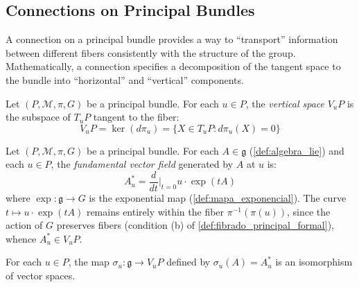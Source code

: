 \subsection{Connections on Principal Bundles}\label{subsec:conexiones_fibrados}

A connection on a principal bundle provides a way to ``transport'' information between different fibers consistently with the structure of the group. Mathematically, a connection specifies a decomposition of the tangent space to the bundle into ``horizontal'' and ``vertical'' components.

\begin{definition}\label{def:espacio_vertical}
Let $(P, \mathcal{M}, \pi, G)$ be a principal bundle. For each $u \in P$, the \textit{vertical space} $V_u P$ is the subspace of $T_u P$ tangent to the fiber:
\[
V_u P = \ker(d\pi_u) = \{X \in T_u P : d\pi_u(X) = 0\}
\]
\end{definition}

\begin{definition}\label{def:campo_vectorial_fundamental}
Let $(P, \mathcal{M}, \pi, G)$ be a principal bundle. For each $A \in \mathfrak{g}$ (\autoref{def:algebra_lie}) and each $u \in P$, the \textit{fundamental vector field} generated by $A$ at $u$ is:
\[
A^*_u = \frac{d}{dt}\bigg|_{t=0} u \cdot \exp(tA)
\]
where $\exp: \mathfrak{g} \to G$ is the exponential map (\autoref{def:mapa_exponencial}). The curve $t \mapsto u \cdot \exp(tA)$ remains entirely within the fiber $\pi^{-1}(\pi(u))$, since the action of $G$ preserves fibers (condition (b) of \autoref{def:fibrado_principal_formal}), whence $A^*_u \in V_u P$.
\end{definition}

\begin{proposition}\label{prop:vertical_lie_isomorfismo}
For each $u \in P$, the map $\sigma_u: \mathfrak{g} \to V_u P$ defined by $\sigma_u(A) = A^*_u$ is an isomorphism of vector spaces.
\end{proposition}

